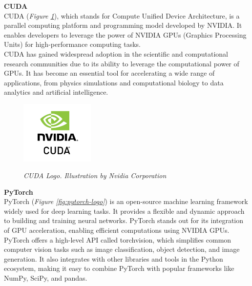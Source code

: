 \vspace{0.5cm}
\textbf{CUDA} \\

CUDA (\textit{Figure \ref{fig:cuda-logo}}), which stands for Compute Unified Device Architecture, is a parallel computing platform and programming model developed by NVIDIA. It enables developers to leverage the power of NVIDIA GPUs (Graphics Processing Units) for high-performance computing tasks. \\

CUDA has gained widespread adoption in the scientific and computational research communities due to its ability to leverage the computational power of GPUs. It has become an essential tool for accelerating a wide range of applications, from physics simulations and computational biology to data analytics and artificial intelligence.

\begin{figure}[H]
\centering
\begin{adjustbox}{trim=0cm 0.25cm 0cm 0.5cm, clip}
\includegraphics[width=0.325\textwidth]{imatges/studies_and_decisions/nvidia-cuda.jpg}
\end{adjustbox}
\caption[CUDA Logo]{\textit{CUDA Logo. Illustration by Nvidia Corporation}}
{\label{fig:cuda-logo}}
\end{figure}

\vspace{0.5cm}
\textbf{PyTorch} \\

PyTorch (\textit{Figure \ref{fig:pytorch-logo}}) is an open-source machine learning framework widely used for deep learning tasks. It provides a flexible and dynamic approach to building and training neural networks. PyTorch stands out for its integration of GPU acceleration, enabling efficient computations using NVIDIA GPUs. \\

PyTorch offers a high-level API called torchvision, which simplifies common computer vision tasks such as image classification, object detection, and image generation. It also integrates with other libraries and tools in the Python ecosystem, making it easy to combine PyTorch with popular frameworks like NumPy, SciPy, and pandas.

